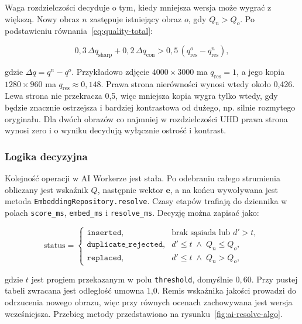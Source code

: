 Waga rozdzielczości decyduje o tym, kiedy mniejsza wersja może wygrać
z większą. Nowy obraz \(n\) zastępuje istniejący obraz \(o\), gdy
\(Q_n>Q_o\). Po podstawieniu równania~\eqref{eq:quality-total}:

\begin{equation}
\label{eq:quality-tradeoff}
0{,}3\,\Delta q_{\mathrm{sharp}}+0{,}2\,\Delta q_{\mathrm{con}}
>0{,}5\,\left(q^{o}_{\mathrm{res}}-q^{n}_{\mathrm{res}}\right),
\end{equation}

gdzie \(\Delta q=q^{n}-q^{o}\). Przykładowo zdjęcie
\(4000\times3000\) ma \(q_{\mathrm{res}}=1\), a jego kopia
\(1280\times960\) ma \(q_{\mathrm{res}}\approx0{,}148\). Prawa strona
nierówności wynosi wtedy około 0,426. Lewa strona nie przekracza
0,5, więc mniejsza kopia wygra tylko wtedy, gdy będzie znacznie
ostrzejsza i bardziej kontrastowa od dużego, np. silnie rozmytego
oryginału. Dla dwóch obrazów co najmniej w rozdzielczości UHD prawa
strona wynosi zero i o wyniku decydują wyłącznie ostrość i kontrast.

\subsubsection{Logika decyzyjna}

Kolejność operacji w AI Workerze jest stała. Po odebraniu całego
strumienia obliczany jest wskaźnik \(Q\), następnie wektor
\(\mathbf{e}\), a na końcu wywoływana jest metoda
\texttt{Embedding\allowbreak Repository.\allowbreak resolve}.
Czasy etapów trafiają do dziennika w polach
\texttt{score\_ms}, \texttt{embed\_ms} i \texttt{resolve\_ms}. Decyzję można zapisać jako:

\begin{equation}
\label{eq:ai-decision}
\mathrm{status}=
\begin{cases}
\texttt{inserted}, & \text{brak sąsiada lub } d'>t,\\
\texttt{duplicate\_rejected}, & d'\leq t \;\wedge\; Q_n\leq Q_o,\\
\texttt{replaced}, & d'\leq t \;\wedge\; Q_n> Q_o,
\end{cases}
\end{equation}

gdzie \(t\) jest progiem przekazanym w polu \texttt{threshold},
domyślnie \(0{,}60\). Przy pustej tabeli zwracana jest odległość
umowna 1,0. Remis wskaźnika jakości prowadzi do odrzucenia nowego
obrazu, więc przy równych ocenach zachowywana jest wersja wcześniejsza.
Przebieg metody przedstawiono na rysunku~\ref{fig:ai-resolve-algo}.

